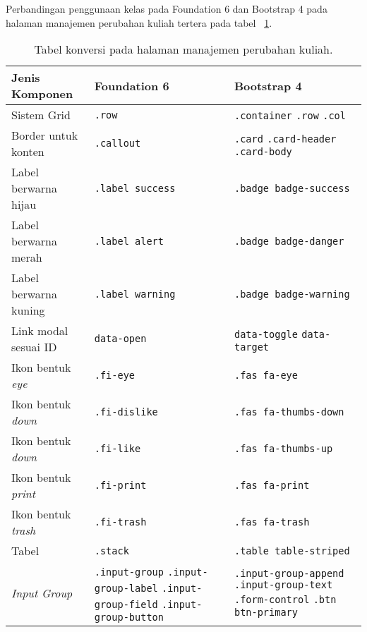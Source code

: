 \noindent Perbandingan penggunaan kelas pada Foundation 6 dan Bootstrap 4 pada halaman manajemen perubahan kuliah tertera pada tabel ~\ref{table:konversiManajemenPerubahanKuliah}.\\
\begin{table}[H]
	\caption{Tabel konversi pada halaman manajemen perubahan kuliah.}
	\begin{tabular}{| p{} | p{} | p{} |} 
		\hline
		\textbf{Jenis Komponen} & \textbf{Foundation 6} & \textbf{Bootstrap 4}  \\ [0.5ex] 
		\hline	
		Sistem Grid & \texttt{.row} &   \texttt{.container} \newline \texttt{.row} \newline \texttt{.col} \\ 
		\hline	
		Border untuk konten & \texttt{.callout} &  \texttt{.card} \newline \texttt{.card-header} \newline \texttt{.card-body} \\	
		\hline	
		Label berwarna hijau & \texttt{.label success} &  \texttt{.badge badge-success} \\
		\hline	
		Label berwarna merah &\texttt{.label alert} & \texttt{.badge badge-danger}  \\
		\hline	
		Label berwarna kuning & \texttt{.label warning} & \texttt{.badge badge-warning}  \\
		\hline	
		Link modal sesuai ID & \texttt{data-open} & \texttt{data-toggle} \newline \texttt{data-target} \\
		\hline
		Ikon bentuk \textit{eye} & \texttt{.fi-eye} &  \texttt{.fas fa-eye} \\	
		\hline	
		Ikon bentuk \textit{down} & \texttt{.fi-dislike} &  \texttt{.fas fa-thumbs-down} \\	
		\hline
		Ikon bentuk \textit{down} & \texttt{.fi-like} &  \texttt{.fas fa-thumbs-up} \\	
		\hline
		Ikon bentuk \textit{print} & \texttt{.fi-print} &  \texttt{.fas fa-print} \\	
		\hline
		Ikon bentuk \textit{trash} & \texttt{.fi-trash} &  \texttt{.fas fa-trash} \\	
		\hline
		Tabel & \texttt{.stack} & \texttt{.table table-striped}  \\
		\hline	
		\textit{Input Group} & \texttt{.input-group} \newline \texttt{.input-group-label} \newline \texttt{.input-group-field} \newline \texttt{.input-group-button} & \texttt{.input-group-append} \newline \texttt{.input-group-text} \newline \texttt{.form-control} \newline \texttt{.btn btn-primary} \\[1ex]
		\hline	
	\end{tabular}
	\label{table:konversiManajemenPerubahanKuliah}
\end{table}



